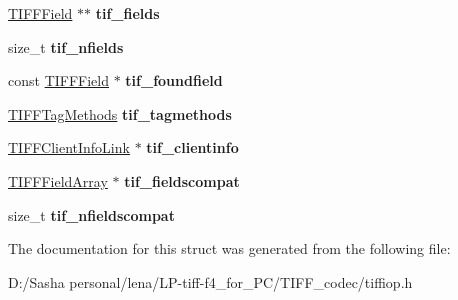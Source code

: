 \begin{DoxyCompactItemize}
\item 
\hypertarget{structtiff_adacb1b1bceaf310bba3d02943d1db855}{}\hyperlink{struct___t_i_f_f_field}{T\+I\+F\+F\+Field} $\ast$$\ast$ {\bfseries tif\+\_\+fields}\label{structtiff_adacb1b1bceaf310bba3d02943d1db855}

\item 
\hypertarget{structtiff_a115a05a4935e5fecf2daf1de616f52bf}{}size\+\_\+t {\bfseries tif\+\_\+nfields}\label{structtiff_a115a05a4935e5fecf2daf1de616f52bf}

\item 
\hypertarget{structtiff_a38690b7a4c946d947a516c5bbeee28a9}{}const \hyperlink{struct___t_i_f_f_field}{T\+I\+F\+F\+Field} $\ast$ {\bfseries tif\+\_\+foundfield}\label{structtiff_a38690b7a4c946d947a516c5bbeee28a9}

\item 
\hypertarget{structtiff_aadb7756036bc92ed10d44a64543d1344}{}\hyperlink{struct_t_i_f_f_tag_methods}{T\+I\+F\+F\+Tag\+Methods} {\bfseries tif\+\_\+tagmethods}\label{structtiff_aadb7756036bc92ed10d44a64543d1344}

\item 
\hypertarget{structtiff_aa35ab22993f0275332f03c3284198b34}{}\hyperlink{structclient__info}{T\+I\+F\+F\+Client\+Info\+Link} $\ast$ {\bfseries tif\+\_\+clientinfo}\label{structtiff_aa35ab22993f0275332f03c3284198b34}

\item 
\hypertarget{structtiff_a79d35ef2716b3e4a4b729885a500cc74}{}\hyperlink{struct___t_i_f_f_field_array}{T\+I\+F\+F\+Field\+Array} $\ast$ {\bfseries tif\+\_\+fieldscompat}\label{structtiff_a79d35ef2716b3e4a4b729885a500cc74}

\item 
\hypertarget{structtiff_ab368683b4409ca5feaea521965bb0d31}{}size\+\_\+t {\bfseries tif\+\_\+nfieldscompat}\label{structtiff_ab368683b4409ca5feaea521965bb0d31}

\end{DoxyCompactItemize}


The documentation for this struct was generated from the following file\+:\begin{DoxyCompactItemize}
\item 
D\+:/\+Sasha personal/lena/\+L\+P-\/tiff-\/f4\+\_\+for\+\_\+\+P\+C/\+T\+I\+F\+F\+\_\+codec/tiffiop.\+h\end{DoxyCompactItemize}
